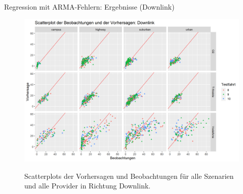 \begin{frame}{Regression mit ARMA-Fehlern: Ergebnisse (Downlink)}
	\begin{figure}
		\centering
		\includegraphics[scale=0.38]{plots/arima/downlink/scatter_colored_axes_fixed}\\
		\caption{Scatterplots der Vorhersagen und Beobachtungen für alle Szenarien und alle Provider in Richtung Downlink.}
		\label{arima_uplink_scatter}
	\end{figure}
\end{frame}




	


